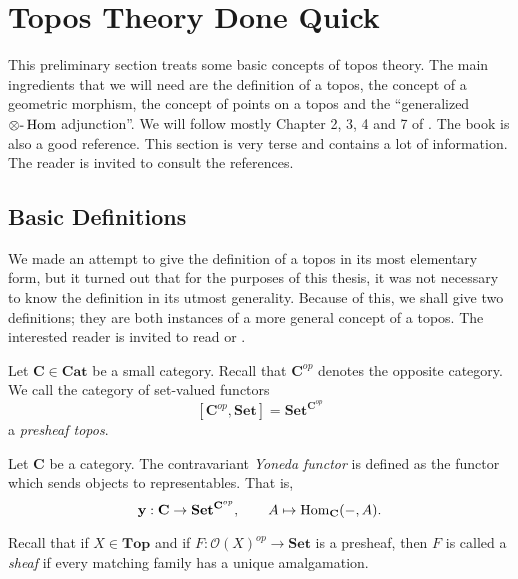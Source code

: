 %
%

\chapter{Topos Theory Done Quick}
This preliminary section treats some basic concepts of topos theory. The main ingredients that we will need are the definition of a topos, the concept of a geometric morphism, the concept of points on a topos and the ``generalized $\otimes\text{-}\operatorname{Hom}$ adjunction''. We will follow mostly Chapter 2, 3, 4 and 7 of \cite{MacLaneMoerdijk91}. The book \cite{johnstone77} is also a good reference. This section is very terse and contains a lot of information. The reader is invited to consult the references.

\section{Basic Definitions}

We made an attempt to give the definition of a topos in its most elementary form, but it turned out that for the purposes of this thesis, it was not necessary to know the definition in its utmost generality. Because of this, we shall give two definitions; they are both instances of a more general concept of a topos. The interested reader is invited to read \cite{johnstone77} or \cite{MacLaneMoerdijk91}.

\begin{definition}
\label{def:presheaf topos}
Let $\mathbf{C} \in \mathbf{Cat}$ be a small category. Recall that $\mathbf{C}^{op}$ denotes the opposite category. We call the category of set-valued functors
\[ [\mathbf{C}^{op}, \mathbf{Set}] = \mathbf{Set}^{\mathbf{C}^{op}} \]
a \emph{presheaf topos}.
\end{definition}

\begin{definition}
\label{def:Yoneda functor}
Let $\mathbf{C}$ be a category. The contravariant \emph{Yoneda functor} is defined as the functor which sends objects to representables. That is,
\[ \mathbf{y} : \mathbf{C} \to \mathbf{Set}^{\mathbf{C}^{op}}, \qquad A \mapsto \operatorname{Hom}_{\mathbf{C}}(-,A). \]
\end{definition}

Recall that if $X \in \mathbf{Top}$ and if $F : \mathcal{O}(X)^{op} \to \mathbf{Set}$ is a presheaf, then $F$ is called a \emph{sheaf} if every matching family has a unique amalgamation.

